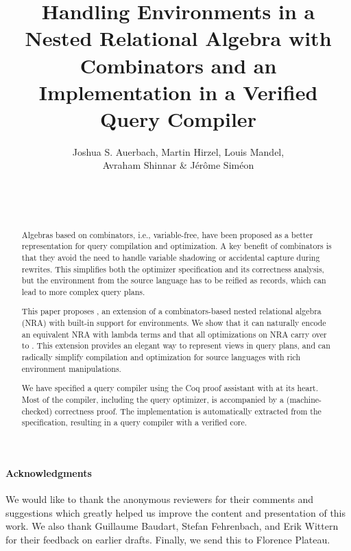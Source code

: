 \documentclass{sig-alternate-05-2015}
\title{Handling Environments in a Nested Relational Algebra with Combinators and an Implementation in a Verified Query Compiler}
\author{\alignauthor
Joshua S. Auerbach, Martin Hirzel, Louis Mandel,\\Avraham Shinnar \& J\'{e}r\^{o}me Sim\'{e}on\\
       \affaddr{IBM Research}\\
       \affaddr{1101 Kitchawan Rd}\\
       \affaddr{Yorktown Heights, NY 10598}\\
}
\begin{document}
\maketitle

\begin{abstract}
  Algebras based on combinators, i.e., variable-free, have been
  proposed as a better representation for query compilation and
  optimization. A key benefit of combinators is that they avoid the
  need to handle variable shadowing or accidental capture during
  rewrites. This simplifies both the optimizer specification and its
  correctness analysis, but the environment from the source language
  has to be reified as records, which can lead to more complex query
  plans.

  This paper proposes \NRAEnv, an extension of a combinators-based
  nested relational algebra (NRA) with built-in support for
  environments. We show that it can naturally encode an equivalent NRA
  with lambda terms and that all optimizations on NRA carry over to
  \NRAEnv. This extension provides an elegant way to represent views
  in query plans, and can radically simplify compilation and
  optimization for source languages with rich environment
  manipulations.
  
  We have specified a query compiler using the Coq proof assistant
  with \NRAEnv at its heart. Most of the compiler, including the query
  optimizer, is accompanied by a (machine-checked) correctness
  proof. The implementation is automatically extracted from the
  specification, resulting in a query compiler with a verified core.
\end{abstract}












\paragraph*{Acknowledgments} We would like to thank the anonymous
reviewers for their comments and suggestions which greatly helped us
improve the content and presentation of this work. We also thank
Guillaume Baudart, Stefan Fehrenbach, and Erik Wittern for their
feedback on earlier drafts.
%
Finally, we send this  to Florence Plateau.




\appendix


\end{document}
